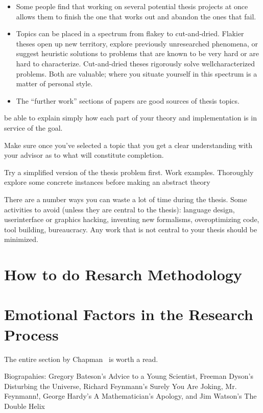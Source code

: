 \begin{itemize}
\item Some people find that working on several potential thesis projects at once allows them to finish the one that works out and abandon the ones that fail.
\item Topics can be placed in a spectrum from flakey to cut-and-dried. Flakier theses open up new territory, explore previously unresearched phenomena, or suggest heuristic solutions to problems that are known to be very hard or are hard to characterize. Cut-and-dried theses rigorously solve wellcharacterized problems. Both are valuable; where you situate yourself in this spectrum is a matter of personal style.
\item The “further work” sections of papers are good sources of thesis topics.
\end{itemize}


be able to explain simply how each part of your theory
and implementation is in service of the goal.

Make sure once you’ve selected a topic that you get a clear understanding with
your advisor as to what will constitute completion.

Try a simplified version of the thesis problem first. Work examples. Thoroughly
explore some concrete instances before making an abstract theory

There are a number ways you can waste a lot of time during the thesis. Some
activities to avoid (unless they are central to the thesis): language design, userinterface
or graphics hacking, inventing new formalisms, overoptimizing code, tool
building, bureaucracy. Any work that is not central to your thesis should be
minimized.
\section{How to do Resarch Methodology}

\section{Emotional Factors in the Research Process}

The entire section by Chapman~\cite{chapman1988how} is worth a read.

Biograpahies: Gregory Bateson’s Advice to a Young Scientist, Freeman Dyson’s
Disturbing the Universe, Richard Feynmann’s Surely You Are Joking, Mr.
Feynmann!, George Hardy’s A Mathematician’s Apology, and Jim Watson’s The Double
Helix
